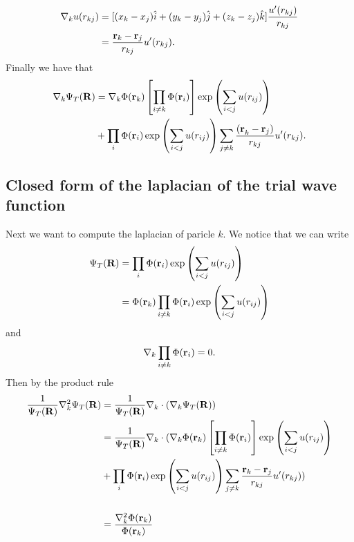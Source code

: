 \documentclass[a4paper,10pt]{article}
\begin{document}
\begin{appendices}
\begin{align}
 \nabla_k u(r_{kj}) &= [(x_k -x_j)\hat{i} + (y_k - y_j)\hat{j} + (z_k - z_j)\hat{k}]\frac{u'(r_{kj})}{r_{kj}} \nonumber \\
                    &= \frac{{\bf r}_k - {\bf r}_j}{r_{kj}}u'(r_{kj}).
\end{align}
Finally we have that 
\begin{align}
 \nabla_k \Psi_T({\bf R}) &= \nabla_k \Phi({\bf r}_k)\left[ \prod_{i \neq k} \Phi({\bf r}_i)\right]\exp \left( \sum_{i<j}u(r_{ij})\right)  \nonumber \\
                            &+ \prod_i \Phi({\bf r}_i)\exp \left( \sum_{i<j}u(r_{ij})\right)\sum_{j \neq k}\frac{{(\bf r}_k - {\bf r}_j)}{r_{kj}}u'(r_{kj}). \label{analytic gradient}
\end{align}
\subsection{Closed form of the laplacian of the trial wave function} \label{closed laplacian}
Next we want to compute the laplacian of paricle $k$. We notice that we can write
\begin{align}
 \Psi_T({\bf R}) &= \prod_i \Phi({\bf r}_i) \exp \left( \sum_{i<j}u(r_{ij})\right) \nonumber \\
                 &= \Phi({\bf r}_k) \prod_{i \neq k} \Phi({\bf r}_i) \exp \left( \sum_{i<j}u(r_{ij})\right) \nonumber
\end{align}
and
\begin{equation}
 \nabla_k \prod_{i \neq k} \Phi({\bf r}_i) = 0.
\end{equation}
Then by the product rule
\begin{align}
 \frac{1}{\Psi_T({\bf R})} \nabla^2_k\Psi_T({\bf R}) &= \frac{1}{\Psi_T({\bf R})} \nabla_k \cdot (\nabla_k \Psi_T({\bf R}))  \nonumber \\
                                                     &= \frac{1}{\Psi_T({\bf R})} \nabla_k \cdot (\nabla_k \Phi({\bf r}_k) \left[\prod_{i \neq k} \Phi({\bf r}_i) \right] \exp \left( \sum_{i<j}u(r_{ij})\right)                                  \nonumber \\ 
                                                     &+ \prod_i \Phi({\bf r}_i) \exp \left( \sum_{i<j}u(r_{ij})\right) \sum_{j \neq k} \frac{{\bf r}_k - {\bf r}_j}{r_{kj}}u'(r_{kj}))  \nonumber \\                                                          \nonumber \\
                                                     &= \frac{\nabla_k^2 \Phi({\bf r}_k)}{\Phi({\bf r}_k)}                                                                                                                                        \nonumber \\

\end{align}
\end{appendices}
\end{document}
